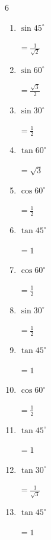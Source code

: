 \begin{multicols}{6}
\begin{enumerate}
  \item $\displaystyle \sin{45^\circ}$

        $\displaystyle =\frac{1}{\sqrt{2}}$

  \item $\displaystyle \sin{60^\circ}$

        $\displaystyle =\frac{\sqrt{3}}{2}$

  \item $\displaystyle \sin{30^\circ}$

        $\displaystyle =\frac{1}{2}$

  \item $\displaystyle \tan{60^\circ}$

        $\displaystyle =\sqrt{3}$

\columnbreak %

  \item $\displaystyle \cos{60^\circ}$

        $\displaystyle =\frac{1}{2}$

  \item $\displaystyle \tan{45^\circ}$

        $\displaystyle =1$

  \item $\displaystyle \cos{60^\circ}$

        $\displaystyle =\frac{1}{2}$

  \item $\displaystyle \sin{30^\circ}$

        $\displaystyle =\frac{1}{2}$

  \item $\displaystyle \tan{45^\circ}$

        $\displaystyle =1$

  \item $\displaystyle \cos{60^\circ}$

        $\displaystyle =\frac{1}{2}$

  \item $\displaystyle \tan{45^\circ}$

        $\displaystyle =1$

  \item $\displaystyle \tan{30^\circ}$

        $\displaystyle =\frac{1}{\sqrt{3}}$

  \item $\displaystyle \tan{45^\circ}$

        $\displaystyle =1$


\end{enumerate}
\end{multicols}
